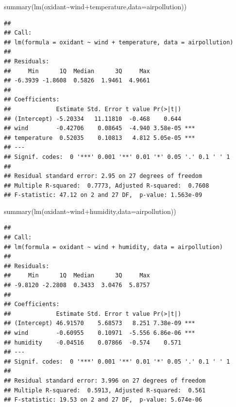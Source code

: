 \documentclass[
]{article}
\newenvironment{Shaded}{\begin{snugshade}}{\end{snugshade}}
\newcommand{\AttributeTok}[1]{\textcolor[rgb]{0.77,0.63,0.00}{#1}}
\newcommand{\FunctionTok}[1]{\textcolor[rgb]{0.00,0.00,0.00}{#1}}
\newcommand{\NormalTok}[1]{#1}
\newcommand{\SpecialCharTok}[1]{\textcolor[rgb]{0.00,0.00,0.00}{#1}}
\begin{document}
\begin{Shaded}
\begin{Highlighting}[]
\FunctionTok{summary}\NormalTok{(}\FunctionTok{lm}\NormalTok{(oxidant}\SpecialCharTok{\textasciitilde{}}\NormalTok{wind}\SpecialCharTok{+}\NormalTok{temperature,}\AttributeTok{data=}\NormalTok{airpollution))}
\end{Highlighting}
\end{Shaded}

\begin{verbatim}
## 
## Call:
## lm(formula = oxidant ~ wind + temperature, data = airpollution)
## 
## Residuals:
##     Min      1Q  Median      3Q     Max 
## -6.3939 -1.8608  0.5826  1.9461  4.9661 
## 
## Coefficients:
##             Estimate Std. Error t value Pr(>|t|)    
## (Intercept) -5.20334   11.11810  -0.468    0.644    
## wind        -0.42706    0.08645  -4.940 3.58e-05 ***
## temperature  0.52035    0.10813   4.812 5.05e-05 ***
## ---
## Signif. codes:  0 '***' 0.001 '**' 0.01 '*' 0.05 '.' 0.1 ' ' 1
## 
## Residual standard error: 2.95 on 27 degrees of freedom
## Multiple R-squared:  0.7773, Adjusted R-squared:  0.7608 
## F-statistic: 47.12 on 2 and 27 DF,  p-value: 1.563e-09
\end{verbatim}

\begin{Shaded}
\begin{Highlighting}[]
\FunctionTok{summary}\NormalTok{(}\FunctionTok{lm}\NormalTok{(oxidant}\SpecialCharTok{\textasciitilde{}}\NormalTok{wind}\SpecialCharTok{+}\NormalTok{humidity,}\AttributeTok{data=}\NormalTok{airpollution))}
\end{Highlighting}
\end{Shaded}

\begin{verbatim}
## 
## Call:
## lm(formula = oxidant ~ wind + humidity, data = airpollution)
## 
## Residuals:
##     Min      1Q  Median      3Q     Max 
## -9.8120 -2.2808  0.3433  3.0476  5.8757 
## 
## Coefficients:
##             Estimate Std. Error t value Pr(>|t|)    
## (Intercept) 46.91570    5.68573   8.251 7.38e-09 ***
## wind        -0.60955    0.10971  -5.556 6.86e-06 ***
## humidity    -0.04516    0.07866  -0.574    0.571    
## ---
## Signif. codes:  0 '***' 0.001 '**' 0.01 '*' 0.05 '.' 0.1 ' ' 1
## 
## Residual standard error: 3.996 on 27 degrees of freedom
## Multiple R-squared:  0.5913, Adjusted R-squared:  0.561 
## F-statistic: 19.53 on 2 and 27 DF,  p-value: 5.674e-06
\end{verbatim}
\end{document}

